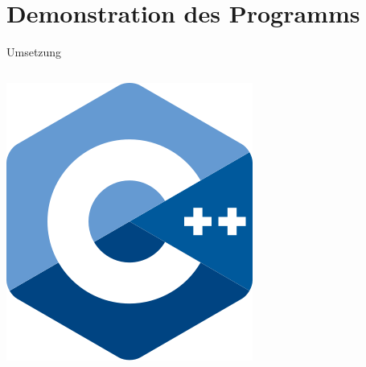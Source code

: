 \section{Demonstration des Programms}

\begin{frame}{Umsetzung}
	
	\begin{columns}[T] %
		\begin{column}{0.3\textwidth}
			\centering
			\includegraphics[width=\textwidth]{images/c++-logo.png}
		\end{column}
		\hfill
		\begin{column}{0.3\textwidth}
			\centering

\end{column}
\end{columns}
\end{frame}
